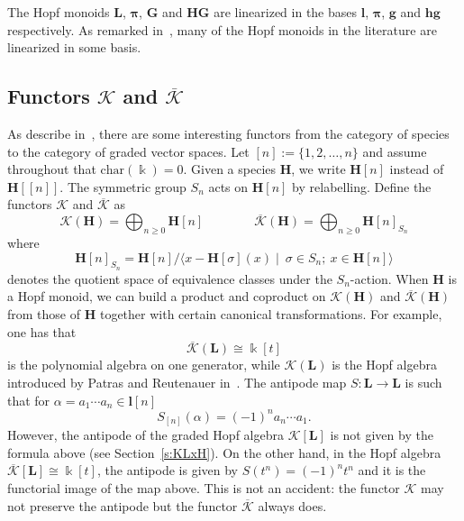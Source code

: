 \documentclass[ALCO,ThmDefs,Unicode,epreuves]{cedram}
\def\field{\Bbbk}
\newcommand{\bL}{\mathbf{L}}
\newcommand{\bH}{\mathbf{H}}
\newcommand{\bPi}{\bpi}
\newcommand{\bG}{\mathbf{G}}
\newcommand{\bpi}{\boldsymbol \pi}
\newcommand{\Kc}{\mathcal{K}}
\newcommand{\Kcb}{\overline{\Kc}}
\begin{document}
The Hopf monoids $\bL$, $\bPi$, $\bG$ and $\mathbf{HG}$ are linearized in the bases $\mathbf{l}$, $\bpi$, $\mathbf{g}$ and $\mathbf{hg}$ respectively. As remarked in~\cite{MarbergLin}, many of the Hopf monoids in the literature are linearized in some basis. 

\subsection{Functors \texorpdfstring{$\mathcal{K}$}{K} and \texorpdfstring{$\overline{\mathcal{K}}$}{overline K}} \label{ss:K_Kbar} 
As describe in~\cite[Section~III]{AM:2010}, there are some interesting functors from the category of species to the category of graded vector spaces. Let $[n]:=\{1,2,\ldots,n\}$ and assume throughout that $\text{char}(\field)=0$. Given a species $\bH$, we write $\bH[n]$ instead of $\bH[[n]]$. The symmetric group $S_n$ acts on $\bH[n]$ by relabelling. Define the functors $\Kc$ and $\Kcb$ as
 $$ \Kc(\mathbf{H}) = \bigoplus_{n\ge 0} \mathbf{H}[n]
 \qquad\qquad
 \Kcb(\mathbf{H}) = \bigoplus_{n\ge 0} \mathbf{H}[n]_{S_n}
 $$
where
 $$
 \mathbf{H}[n]_{S_n}={\bH}[n]\Big/ \langle x-{\bH}[\sigma](x) \mid \ \sigma\in S_n; \ x\in {\bH}[n]\rangle
 $$
 denotes the quotient space of equivalence classes under the $S_n$-action. When $\bH$ is a Hopf monoid, 
 we can build a product and coproduct
on $ \Kc({\bH})$ and $ \Kcb({\bH})$ from those of $\bH$ together
with certain canonical transformations.
For example, one has that
\[
\Kcb(\bL)\cong\field[t]
\]
is the polynomial algebra on one generator, while $\Kc(\bL)$
is the Hopf algebra introduced by Patras and Reutenauer in~\cite{PR:2004}. The antipode map $S:\bL\rightarrow\bL$ is such that
for $\alpha=a_1\cdots a_n\in\mathbf{l}[n]$
 $$ S_{[n]}(\alpha)=(-1)^n a_n\cdots a_1.$$
 However, the antipode of the graded Hopf algebra $\Kc[\bL]$ is not given by the formula above (see Section~\ref{s:KLxH}). On the other hand, in the Hopf algebra $\Kcb[\bL]\cong \field[t]$, the antipode is given by $S(t^n)=(-1)^nt^n$ and it is the functorial image of the map above. This is not an accident: the functor $\Kc$ may not preserve the antipode but the functor $\Kcb$ always does.

\end{document}
